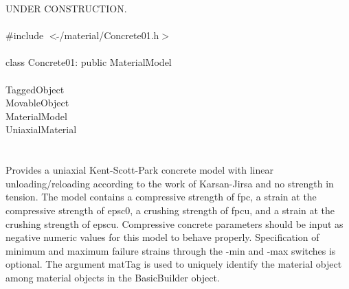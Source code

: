 
UNDER CONSTRUCTION.\\

   \\
\indent \#include $<\tilde{ }$/material/Concrete01.h$>$  \\

  \\
\indent class Concrete01: public MaterialModel \\

 \\
\indent TaggedObject \\
\indent MovableObject \\
\indent\indent MaterialModel \\
\indent\indent\indent UniaxialMaterial \\
\indent\indent\indent{} \\

  \\
\indent 
Provides a uniaxial Kent-Scott-Park concrete model with linear
unloading/reloading according to the work of Karsan-Jirsa and no
strength in tension. The model contains a compressive strength of fpc,
a strain at the compressive strength of epsc0, a crushing strength of
fpcu, and a strain at the crushing strength of epscu. Compressive
concrete parameters should be input as negative numeric values for
this model to behave properly. Specification of minimum and maximum
failure strains through the -min and -max switches is optional. The
argument matTag is used to uniquely identify the material object among
material objects in the BasicBuilder object. \\

